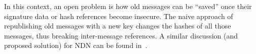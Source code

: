 \documentclass[9pt,sigconf]{acmart}
\begin{document}
In this context, an open problem is how old messages can be ``saved'' once their signature data or hash references become insecure. The naive approach of republishing old messages with a new key changes the hashes of all those messages, thus breaking inter-message references.
A similar discussion (and proposed solution) for NDN can be found in~\cite{DeLorean}.
%
%

%
%



\end{document}
